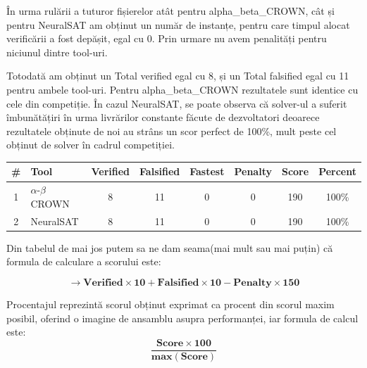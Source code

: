 

În urma rulării a tuturor fișierelor atât pentru alpha\_beta\_CROWN, cât și pentru NeuralSAT am obținut un număr de instanțe, pentru care timpul alocat verificării a fost depășit, egal cu 0. Prin urmare nu avem penalități pentru niciunul dintre tool-uri.

Totodată am obținut un Total verified egal cu 8, și un Total falsified egal cu 11 pentru ambele tool-uri. Pentru alpha\_beta\_CROWN rezultatele sunt identice cu cele din competiție. În cazul NeuralSAT, se poate observa că solver-ul
a suferit îmbunătățiri în urma livrărilor constante făcute de dezvoltatori deoarece rezultatele obținute de noi au strâns un scor perfect de 100\%, mult peste cel obținut de solver în cadrul competiției.

\begin{table}[h]
\centering
\begin{tabular}{clcccccc}
\hline
\# & Tool & Verified & Falsified & Fastest & Penalty & Score & Percent \\ \hline
1 & \(\alpha\)-\(\beta\) CROWN & 8 & 11 & 0 & 0 & 190 & 100\% \\
2 & NeuralSAT & 8 & 11 & 0 & 0 & 190 & 100\% \\ \hline
\end{tabular}
\end{table}

Din tabelul de mai jos putem sa ne dam seama(mai mult sau mai puțin) că formula de calculare a scorului este: 

\[
\mathbf{\rightarrow \textbf{Verified} \times 10 + \textbf{Falsified} \times 10 - \textbf{Penalty} \times 150}
\]


Procentajul reprezintă scorul obținut exprimat ca procent din scorul maxim
posibil, oferind o imagine de ansamblu asupra performanței, iar formula de calcul
este:
\[
\mathbf{\frac{\textbf{Score} \times 100}{\textbf{max}(\textbf{Score})}}
\]

